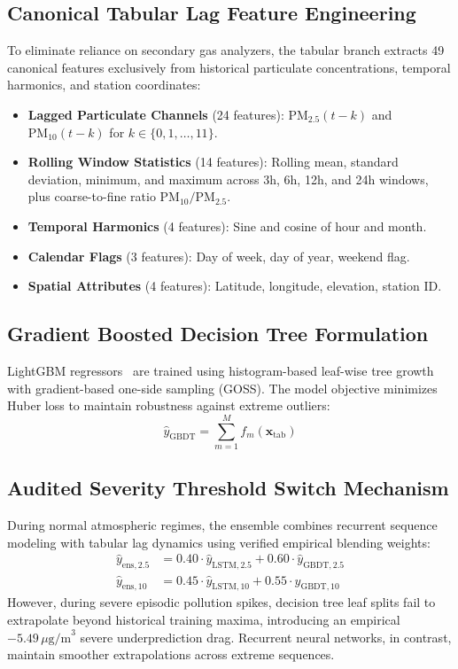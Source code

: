 \documentclass[conference]{IEEEtran}
\begin{document}
\subsection{Canonical Tabular Lag Feature Engineering}
To eliminate reliance on secondary gas analyzers, the tabular branch extracts 49 canonical features exclusively from historical particulate concentrations, temporal harmonics, and station coordinates:
\begin{itemize}
    \item \textbf{Lagged Particulate Channels} (24 features): $\text{PM}_{2.5}(t-k)$ and $\text{PM}_{10}(t-k)$ for $k \in \{0, 1, \dots, 11\}$.
    \item \textbf{Rolling Window Statistics} (14 features): Rolling mean, standard deviation, minimum, and maximum across 3h, 6h, 12h, and 24h windows, plus coarse-to-fine ratio $\text{PM}_{10}/\text{PM}_{2.5}$.
    \item \textbf{Temporal Harmonics} (4 features): Sine and cosine of hour and month.
    \item \textbf{Calendar Flags} (3 features): Day of week, day of year, weekend flag.
    \item \textbf{Spatial Attributes} (4 features): Latitude, longitude, elevation, station ID.
\end{itemize}

\subsection{Gradient Boosted Decision Tree Formulation}
LightGBM regressors~\cite{ke2017lightgbm} are trained using histogram-based leaf-wise tree growth with gradient-based one-side sampling (GOSS). The model objective minimizes Huber loss to maintain robustness against extreme outliers:
\begin{equation}
\hat{y}_{\text{GBDT}} = \sum_{m=1}^M f_m(\mathbf{x}_{\text{tab}})
\end{equation}

\subsection{Audited Severity Threshold Switch Mechanism}
During normal atmospheric regimes, the ensemble combines recurrent sequence modeling with tabular lag dynamics using verified empirical blending weights:
\begin{align}
\hat{y}_{\text{ens}, 2.5} &= 0.40 \cdot \hat{y}_{\text{LSTM}, 2.5} + 0.60 \cdot \hat{y}_{\text{GBDT}, 2.5} \\
\hat{y}_{\text{ens}, 10} &= 0.45 \cdot \hat{y}_{\text{LSTM}, 10} + 0.55 \cdot \hat{y}_{\text{GBDT}, 10}
\end{align}
However, during severe episodic pollution spikes, decision tree leaf splits fail to extrapolate beyond historical training maxima, introducing an empirical $-5.49\,\mu\text{g/m}^3$ severe underprediction drag. Recurrent neural networks, in contrast, maintain smoother extrapolations across extreme sequences.
\end{document}

